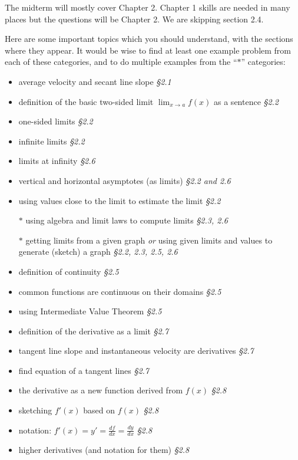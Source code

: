 \documentclass[12pt]{article}
\begin{document}
\renewcommand{\d}{\displaystyle}

The midterm will mostly cover Chapter 2.  Chapter 1 skills are needed in many places but the questions will be Chapter 2.  We are skipping section 2.4.

Here are some important topics which you should understand, with the sections where they appear.  It would be wise to find at least one example problem from each of these categories, and to do multiple examples from the ``\Large$\ast$\normalsize'' categories:
\begin{itemize}
\item average velocity and secant line slope \hfill \emph{\S 2.1}
\item definition of the basic two-sided limit $\lim_{x\to a} f(x)$ as a sentence \hfill\emph{\S 2.2}
\item one-sided limits  \hfill \emph{\S 2.2}
\item infinite limits  \hfill \emph{\S 2.2}
\item limits at infinity  \hfill \emph{\S 2.6}
\item vertical and horizontal asymptotes (as limits)  \hfill \emph{\S 2.2 and 2.6}
\item using values close to the limit to estimate the limit  \hfill \emph{\S 2.2}
\item[\Large $\ast$] using algebra and limit laws to compute limits  \hfill \emph{\S 2.3, 2.6}
\item[\Large $\ast$] getting limits from a given graph \emph{or} using given limits and values to generate (sketch) a graph  \hfill \emph{\S 2.2, 2.3, 2.5, 2.6}
\item definition of continuity  \hfill \emph{\S 2.5}
\item common functions are continuous on their domains  \hfill \emph{\S 2.5}
\item using Intermediate Value Theorem  \hfill \emph{\S 2.5}
\item definition of the derivative as a limit  \hfill \emph{\S 2.7}
\item tangent line slope and instantaneous velocity are derivatives  \hfill \emph{\S 2.7}
\item find equation of a tangent lines  \hfill \emph{\S 2.7}
\item the derivative as a new function derived from $f(x)$  \hfill \emph{\S 2.8}
\item sketching $f'(x)$ based on $f(x)$  \hfill \emph{\S 2.8}
\item notation: $f'(x)=y'=\frac{df}{dx}=\frac{dy}{dx}$  \hfill \emph{\S 2.8}
\item higher derivatives (and notation for them)  \hfill \emph{\S 2.8}
\end{itemize}
\end{document}
